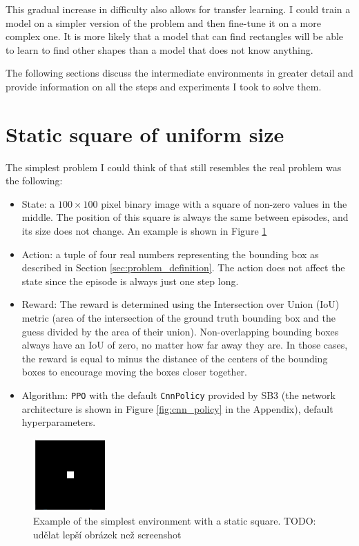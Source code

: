 \documentclass[
  digital,     %
  oneside,     %
  nosansbold,  %
  nocolorbold, %
  lof,         %
  lot,         %
]{fithesis4}
\begin{document}
This gradual increase in difficulty also allows for transfer learning. I could train a model on a simpler version of the problem and then fine-tune it on a more complex one. It is more likely that a model that can find rectangles will be able to learn to find other shapes than a model that does not know anything.

The following sections discuss the intermediate environments in greater detail and provide information on all the steps and experiments I took to solve them.

\section{Static square of uniform size}
The simplest problem I could think of that still resembles the real problem was the following:
\begin{itemize}
    \item State: a $100\times100$ pixel binary image with a square of non-zero values in the middle. The position of this square is always the same between episodes, and its size does not change. An example is shown in Figure \ref{fig:env0}
    \item Action: a tuple of four real numbers representing the bounding box as described in Section \ref{sec:problem_definition}. The action does not affect the state since the episode is always just one step long.
    \item Reward: The reward is determined using the Intersection over Union (IoU) metric (area of the intersection of the ground truth bounding box and the guess divided by the area of their union). Non-overlapping bounding boxes always have an IoU of zero, no matter how far away they are. In those cases, the reward is equal to minus the distance of the centers of the bounding boxes to encourage moving the boxes closer together.
    \item Algorithm: \texttt{PPO} with the default \texttt{CnnPolicy} provided by SB3 (the network architecture is shown in Figure \ref{fig:cnn_policy} in the Appendix), default hyperparameters.
\end{itemize}

\begin{figure}
    \includegraphics[width=0.5\linewidth]{env_examples/env0.png}
    \caption{Example of the simplest environment with a static square. TODO: udělat lepší obrázek než screenshot}
    \label{fig:env0}
\end{figure}
\end{document}

